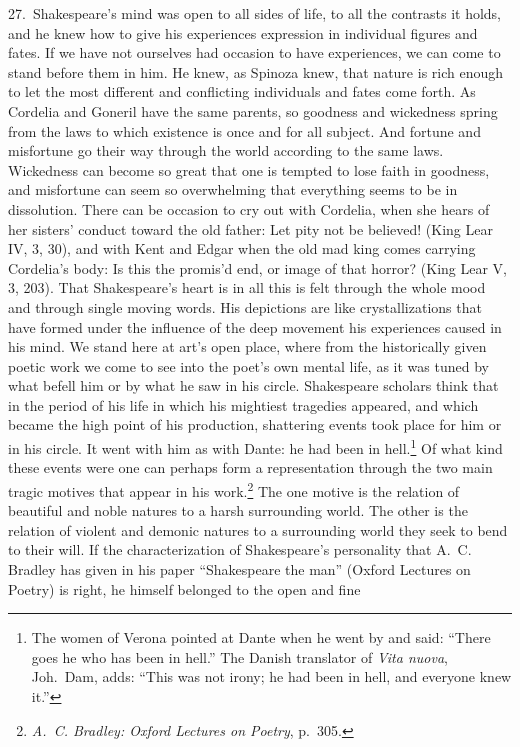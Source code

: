 \documentclass[12pt]{book}
\newcommand{\opage}[1]{\marginnote{\footnotesize\textit{[#1]}}}
\begin{document}
27.~Shakespeare's mind was open to all sides of life, to all the contrasts it holds, and
he knew how to give his experiences expression in individual figures and fates. If we
have not ourselves had occasion to have experiences, we can come to stand before them in
him. He knew, as Spinoza knew, that nature is rich enough to let the most different and
conflicting individuals and fates come forth. As Cordelia and Goneril have the same
parents, so goodness and wickedness spring from the laws to which existence is once and
for all subject. And fortune \opage{98}and misfortune go their way through the world
according to the same laws. Wickedness can become so great that one is tempted to lose
faith in goodness, and misfortune can seem so overwhelming that everything seems to be
in dissolution. There can be occasion to cry out with Cordelia, when she hears of her
sisters' conduct toward the old father: Let pity not be believed! (King Lear IV, 3, 30),
and with Kent and Edgar when the old mad king comes carrying Cordelia's body: Is this
the promis'd end, or image of that horror? (King Lear V, 3, 203).
That Shakespeare's heart is in all this is felt through the whole mood and through single
moving words. His depictions are like crystallizations that have formed under the
influence of the deep movement his experiences caused in his mind. We stand here at
art's open place, where from the historically given poetic work we come to see into the
poet's own mental life, as it was tuned by what befell him or by what he saw in his
circle. Shakespeare scholars think that in the period of his life in which his mightiest
tragedies appeared, and which became the high point of his production, shattering events
took place for him or in his circle. It went with him as with Dante: he had been in
hell.\footnote{The women of Verona pointed at Dante when he went by and said: ``There
goes he who has been in hell.'' The Danish translator of \textit{Vita nuova}, Joh.\ Dam,
adds: ``This was not irony; he had been in hell, and everyone knew it.''} Of what kind
these events were one can perhaps form a representation through the two main tragic
motives that appear in his work.\footnote{\textit{A.~C. Bradley: Oxford Lectures on
Poetry}, p.~305.} The one motive is the relation of beautiful and noble natures to a
harsh surrounding world. The other is the relation of violent and demonic natures to a
surrounding world they seek to bend to their will. If the characterization of
Shakespeare's personality that A.~C. Bradley has given in his paper ``Shakespeare the
man'' (Oxford Lectures on Poetry) is right, he himself belonged to the open and fine
\end{document}
